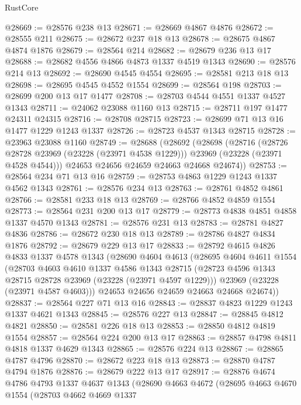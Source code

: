 \begin{lexlean}{RustCore}
\begin{coremodule}
@28669 := @28576 @238 @13
@28671 := @28669 @4867 @4876
@28672 := @28555 @211
@28675 := @28672 @237 @18 @13
@28678 := @28675 @4867 @4874 @1876
@28679 := @28564 @214
@28682 := @28679 @236 @13 @17
@28688 := @28682 @4556 @4866 @4873 @1337 @4519 @1343
@28690 := @28576 @214 @13
@28692 := @28690 @4545 @4554
@28695 := @28581 @213 @18 @13
@28698 := @28695 @4545 @4552 @1554
@28699 := @28564 @198
@28703 := @28699 @200 @13 @17 @1477
@28708 := @28703 @4544 @4551 @1337 @4527 @1343
@28711 := @24062 @23088 @1160 @13
@28715 := @28711 @197 @1477 @24311 @24315
@28716 := @28708 @28715
@28723 := @28699 @71 @13 @16 @1477 @1229 @1243 @1337
@28726 := @28723 @4537 @1343 @28715
@28728 := @23963 @23088 @1160
@28749 := @28688
    (@28692
      (@28698
        (@28716
          (@28726 @28728 @23969 (@23228 (@23971 @4538 @1229)))
          @23969
          (@23228 (@23971 @4528 @4544)))
        @24653
        @24656
        @24659
        @24663
        @24668
        @24674))
@28753 := @28564 @234 @71 @13 @16
@28759 := @28753 @4863 @1229 @1243 @1337 @4562 @1343
@28761 := @28576 @234 @13
@28763 := @28761 @4852 @4861
@28766 := @28581 @233 @18 @13
@28769 := @28766 @4852 @4859 @1554
@28773 := @28564 @231 @200 @13 @17
@28779 := @28773 @4838 @4851 @4858 @1337 @4570 @1343
@28781 := @28576 @231 @13
@28783 := @28781 @4827 @4836
@28786 := @28672 @230 @18 @13
@28789 := @28786 @4827 @4834 @1876
@28792 := @28679 @229 @13 @17
@28833 := @28792
    @4615
    @4826
    @4833
    @1337
    @4578
    @1343
    (@28690
      @4604
      @4613
      (@28695
        @4604
        @4611
        @1554
        (@28703
          @4603
          @4610
          @1337
          @4586
          @1343
          @28715
          (@28723 @4596 @1343 @28715 @28728 @23969 (@23228 (@23971 @4597 @1229)))
          @23969
          (@23228 (@23971 @4587 @4603)))
        @24653
        @24656
        @24659
        @24663
        @24668
        @24674))
@28837 := @28564 @227 @71 @13 @16
@28843 := @28837 @4823 @1229 @1243 @1337 @4621 @1343
@28845 := @28576 @227 @13
@28847 := @28845 @4812 @4821
@28850 := @28581 @226 @18 @13
@28853 := @28850 @4812 @4819 @1554
@28857 := @28564 @224 @200 @13 @17
@28863 := @28857 @4798 @4811 @4818 @1337 @4629 @1343
@28865 := @28576 @224 @13
@28867 := @28865 @4787 @4796
@28870 := @28672 @223 @18 @13
@28873 := @28870 @4787 @4794 @1876
@28876 := @28679 @222 @13 @17
@28917 := @28876
    @4674
    @4786
    @4793
    @1337
    @4637
    @1343
    (@28690
      @4663
      @4672
      (@28695
        @4663
        @4670
        @1554
        (@28703
          @4662
          @4669
          @1337

\end{coremodule}
\end{lexlean}
